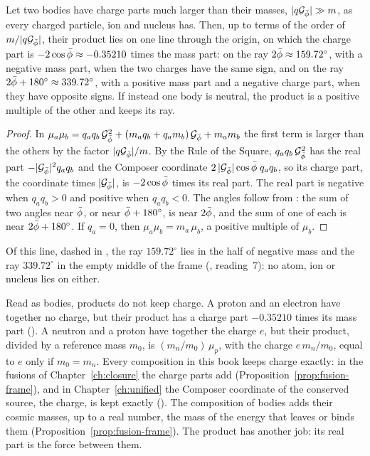 \begin{proposition}\label{prop:op-land}
Let two bodies have charge parts much larger than their masses, $|q\mathcal{G}_{\bar{\phi}}| \gg m$, as every charged particle, ion and nucleus has. Then, up to terms of the order of $m/|q\mathcal{G}_{\bar{\phi}}|$, their product lies on one line through the origin, on which the charge part is $-2\cos\bar{\phi} \approx -0.35210$ times the mass part: on the ray $2\bar{\phi} \approx 159.72^\circ$, with a negative mass part, when the two charges have the same sign, and on the ray $2\bar{\phi} + 180^\circ \approx 339.72^\circ$, with a positive mass part and a negative charge part, when they have opposite signs. If instead one body is neutral, the product is a positive multiple of the other and keeps its ray.
\end{proposition}

\begin{proof}
In $\mu_a\mu_b = q_a q_b\,\mathcal{G}_{\bar{\phi}}^2 + (m_a q_b + q_a m_b)\,\mathcal{G}_{\bar{\phi}} + m_a m_b$ the first term is larger than the others by the factor $|q\mathcal{G}_{\bar{\phi}}|/m$. By the Rule of the Square, $q_a q_b\,\mathcal{G}_{\bar{\phi}}^2$ has the real part $-|\mathcal{G}_{\bar{\phi}}|^2 q_a q_b$ and the Composer coordinate $2\,|\mathcal{G}_{\bar{\phi}}|\cos\bar{\phi}\;q_a q_b$, so its charge part, the coordinate times $|\mathcal{G}_{\bar{\phi}}|$, is $-2\cos\bar{\phi}$ times its real part. The real part is negative when $q_a q_b > 0$ and positive when $q_a q_b < 0$. The angles follow from : the sum of two angles near $\bar{\phi}$, or near $\bar{\phi} + 180^\circ$, is near $2\bar{\phi}$, and the sum of one of each is near $2\bar{\phi} + 180^\circ$. If $q_a = 0$, then $\mu_a\mu_b = m_a\,\mu_b$, a positive multiple of $\mu_b$.
\end{proof}

Of this line, dashed in , the ray $159.72^\circ$ lies in the half of negative mass and the ray $339.72^\circ$ in the empty middle of the frame (, reading~7): no atom, ion or nucleus lies on either.

\begin{remark}\label{rem:op-charge-kept}
Read as bodies, products do not keep charge. A proton and an electron have together no charge, but their product has a charge part $-0.35210$ times its mass part (). A neutron and a proton have together the charge $e$, but their product, divided by a reference mass $m_0$, is $(m_n/m_0)\,\mu_p$, with the charge $e\,m_n/m_0$, equal to $e$ only if $m_0 = m_n$. Every composition in this book keeps charge exactly: in the fusions of Chapter~\ref{ch:closure} the charge parts add (Proposition~\ref{prop:fusion-frame}), and in Chapter~\ref{ch:unified} the Composer coordinate of the conserved source, the charge, is kept exactly (). The composition of bodies adds their cosmic masses, up to a real number, the mass of the energy that leaves or binds them (Proposition~\ref{prop:fusion-frame}). The product has another job: its real part is the force between them.
\end{remark}

